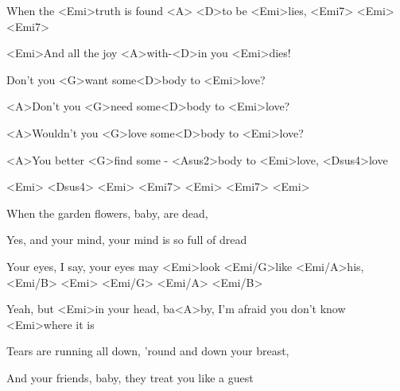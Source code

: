 


\zs
When the <Emi>truth is found  <A> <D>to be <Emi>lies,   <Emi7> <Emi> <Emi7>

<Emi>And all the joy <A>with-<D>in you <Emi>dies!
\ks

\zr
Don't you <G>want some<D>body to <Emi>love?

<A>Don't you <G>need some<D>body to <Emi>love?

<A>Wouldn't you <G>love some<D>body to <Emi>love?

<A>You better <G>find some - <Asus2>body to <Emi>love,     <Dsus4>love

   <Emi>             <Dsus4>         <Emi> <Emi7> <Emi> <Emi7>  <Emi>
\kr


\zs
When the garden flowers, baby, are dead,

Yes, and your mind, your mind is so full of dread
\ks

\zr
\kr

\zs
Your eyes, I say, your eyes may <Emi>look <Emi/G>like   <Emi/A>his, <Emi/B>
<Emi> <Emi/G> <Emi/A> <Emi/B>

Yeah, but <Emi>in your head, ba<A>by,
I'm afraid you don't know <Emi>where it is
\ks

\zr\kr

\zs

Tears are running all down, 'round and down your breast,

And your friends, baby, they treat you like a guest
\ks

\zr\kr

\kp
